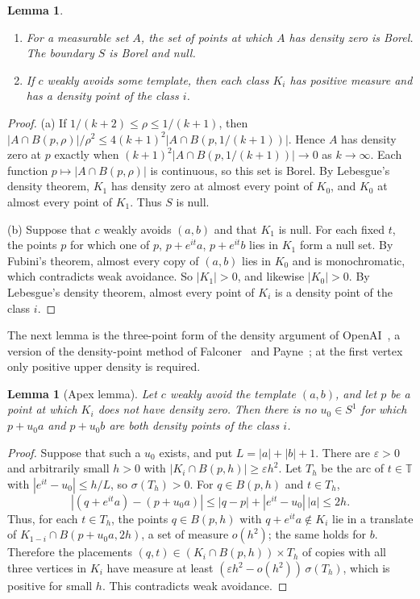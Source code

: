 \documentclass[10pt]{article}
\newtheorem{lem}[thm]{Lemma}
\theoremstyle{remark}
\newcommand{\T}{\mathbb T}
\begin{document}
\begin{lem}\label{lem:density}
\begin{enumerate}
\item[(a)] For a measurable set $A$, the set of points at which $A$ has density zero is Borel. The boundary $S$ is Borel and null.
\item[(b)] If $c$ weakly avoids some template, then each class $K_i$ has positive measure and has a density point of the class $i$.
\end{enumerate}
\end{lem}

\begin{proof}
(a) If $1/(k+2)\le\rho\le1/(k+1)$, then $|A\cap B(p,\rho)|/\rho^2\le4(k+1)^2|A\cap B(p,1/(k+1))|$. Hence $A$ has density zero at $p$ exactly when $(k+1)^2|A\cap B(p,1/(k+1))|\to0$ as $k\to\infty$. Each function $p\mapsto|A\cap B(p,\rho)|$ is continuous, so this set is Borel. By Lebesgue's density theorem, $K_1$ has density zero at almost every point of $K_0$, and $K_0$ at almost every point of $K_1$. Thus $S$ is null.

(b) Suppose that $c$ weakly avoids $(a,b)$ and that $K_1$ is null. For each fixed $t$, the points $p$ for which one of $p$, $p+e^{it}a$, $p+e^{it}b$ lies in $K_1$ form a null set. By Fubini's theorem, almost every copy of $(a,b)$ lies in $K_0$ and is monochromatic, which contradicts weak avoidance. So $|K_1|>0$, and likewise $|K_0|>0$. By Lebesgue's density theorem, almost every point of $K_i$ is a density point of the class $i$.
\end{proof}

The next lemma is the three-point form of the density argument of OpenAI~\cite[Lemma~4.3]{OAI}, a version of the density-point method of Falconer~\cite{Falconer} and Payne~\cite[Lemma~1 and Proposition~1]{Payne}; at the first vertex only positive upper density is required.

\begin{lem}[Apex lemma]\label{lem:apex}
Let $c$ weakly avoid the template $(a,b)$, and let $p$ be a point at which $K_i$ does not have density zero. Then there is no $u_0\in S^1$ for which $p+u_0a$ and $p+u_0b$ are both density points of the class $i$.
\end{lem}

\begin{proof}
Suppose that such a $u_0$ exists, and put $L=|a|+|b|+1$. There are $\varepsilon>0$ and arbitrarily small $h>0$ with $|K_i\cap B(p,h)|\ge\varepsilon h^2$. Let $T_h$ be the arc of $t\in\T$ with $|e^{it}-u_0|\le h/L$, so $\sigma(T_h)>0$. For $q\in B(p,h)$ and $t\in T_h$,
\[
 |(q+e^{it}a)-(p+u_0a)|\le|q-p|+|e^{it}-u_0|\,|a|\le2h.
\]
Thus, for each $t\in T_h$, the points $q\in B(p,h)$ with $q+e^{it}a\notin K_i$ lie in a translate of $K_{1-i}\cap B(p+u_0a,2h)$, a set of measure $o(h^2)$; the same holds for $b$. Therefore the placements $(q,t)\in(K_i\cap B(p,h))\times T_h$ of copies with all three vertices in $K_i$ have measure at least $(\varepsilon h^2-o(h^2))\,\sigma(T_h)$, which is positive for small $h$. This contradicts weak avoidance.
\end{proof}
\end{document}
